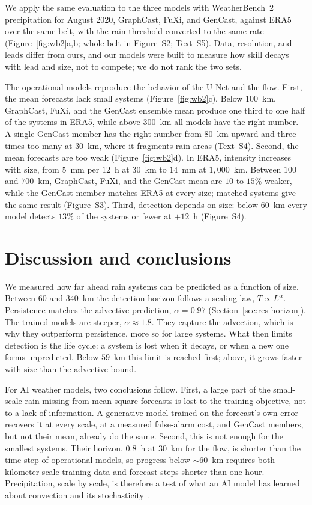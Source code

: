 \documentclass[draft]{agujournal2019}
\begin{document}
We apply the same evaluation to the three models with WeatherBench~2
precipitation for August 2020, GraphCast, FuXi, and GenCast, against ERA5 over the same belt, with the rain threshold
converted to the same rate (Figure~\ref{fig:wb2}a,b; whole belt in
Figure~S2; Text~S5). Data, resolution,
and leads differ from ours, and our models were built to measure how skill
decays with lead and size, not to compete; we do not rank the two sets.

The operational models reproduce the behavior of the U-Net and the flow.
First, the mean forecasts lack small systems (Figure~\ref{fig:wb2}c).
Below $100$~km, GraphCast, FuXi, and the GenCast ensemble mean produce one
third to one half of the systems in ERA5, while above $300$~km all models
have the right number. A single GenCast member has the right number from
$80$~km upward and three times too many at $30$~km, where it fragments
rain areas (Text~S4). Second, the mean forecasts are too weak
(Figure~\ref{fig:wb2}d). In ERA5, intensity increases with size, from
$5$~mm per $12$~h at $30$~km to $14$~mm at $1{,}000$~km. Between $100$ and
$700$~km, GraphCast, FuXi, and the GenCast mean are $10$ to $15\%$ weaker,
while the GenCast member matches ERA5 at every size; matched systems give
the same result (Figure~S3). Third, detection depends on size: below
$60$~km every model detects $13\%$ of the systems or fewer at $+12$~h (Figure~S4).



\section{Discussion and conclusions}\label{sec:discussion}

We measured how far ahead rain systems can be predicted as a function of
size. Between $60$ and $340$~km the detection
horizon follows a scaling law, $T \propto L^{\alpha}$. Persistence matches
the advective prediction, $\alpha = 0.97$ (Section~\ref{sec:res-horizon}). The trained models are steeper, $\alpha \approx 1.8$. They capture
the advection, which is why they outperform persistence, more so for large
systems. What then limits detection is the life cycle: a system is lost
when it decays, or when a new one forms unpredicted. Below $59$~km this
limit is reached first; above, it grows faster with size than the
advective bound.

For AI weather models, two conclusions follow. First, a large part of the
small-scale rain missing from mean-square forecasts is lost to the
training objective, not to a lack of information. A generative model
trained on the forecast's own error recovers it at every scale, at a
measured false-alarm cost, and GenCast members,
but not their mean, already do the same. Second, this is not enough for
the smallest systems. Their horizon, $0.8$~h at $30$~km for the flow, is
shorter than the time step of operational models, so progress below
${\sim}60$~km requires both kilometer-scale training data and forecast
steps shorter than one hour. Precipitation, scale by scale, is therefore a
test of what an AI model has learned about convection and its
stochasticity \cite{shamekh2023}.
\end{document}
